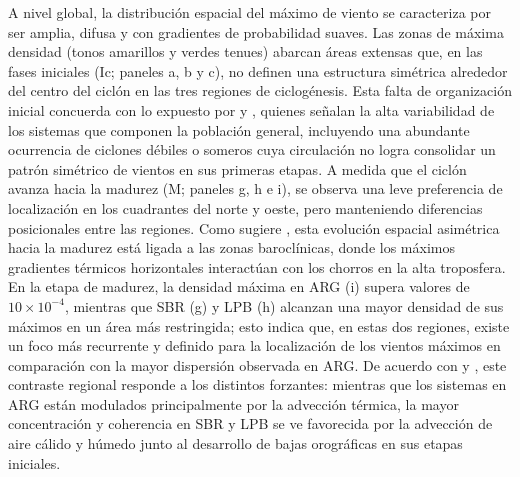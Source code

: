 A nivel global, la distribución espacial del máximo de viento se caracteriza por ser amplia, difusa y con gradientes de probabilidad suaves. Las zonas de máxima densidad (tonos amarillos y verdes tenues) abarcan áreas extensas que, en las fases iniciales (Ic; paneles a, b y c), no definen una estructura simétrica alrededor del centro del ciclón en las tres regiones de ciclogénesis. Esta falta de organización inicial concuerda con lo expuesto por \citet{reboita2010south} y \citet{gozzo2017climatology}, quienes señalan la alta variabilidad de los sistemas que componen la población general, incluyendo una abundante ocurrencia de ciclones débiles o someros cuya circulación no logra consolidar un patrón simétrico de vientos en sus primeras etapas.
A medida que el ciclón avanza hacia la madurez (M; paneles g, h e i), se observa una leve preferencia de localización en los cuadrantes del norte y oeste, pero manteniendo diferencias posicionales entre las regiones. Como sugiere \citet{dossantos2023response}, esta evolución espacial asimétrica hacia la madurez está ligada a las zonas baroclínicas, donde los máximos gradientes térmicos horizontales interactúan con los chorros en la alta troposfera.
En la etapa de madurez, la densidad máxima en ARG (i) supera valores de $10 \times 10^{-4}$, mientras que SBR (g) y LPB (h) alcanzan una mayor densidad de sus máximos en un área más restringida; esto indica que, en estas dos regiones, existe un foco más recurrente y definido para la localización de los vientos máximos en comparación con la mayor dispersión observada en ARG. De acuerdo con \citet{gramcianinov2019properties} y \citet{cardoso2022synoptic}, este contraste regional responde a los distintos forzantes: mientras que los sistemas en ARG están modulados principalmente por la advección térmica, la mayor concentración y coherencia en SBR y LPB se ve favorecida por la advección de aire cálido y húmedo junto al desarrollo de bajas orográficas en sus etapas iniciales.

